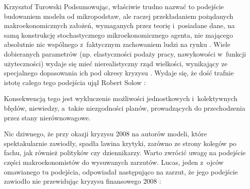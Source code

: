 \begin{artplenv}{Krzysztof Turowski}
Podsumowując, właściwie trudno nazwać to podejście budowaniem modelu od mikropodstaw, ale raczej przekładaniem
pożądanych makroekonomicznych założeń, wymaganych przez teorię i~posiadane dane, na samą konstrukcję stochastycznego
mikroekonomicznego agenta, nie mającego absolutnie nic wspólnego z~faktycznym zachowaniem ludzi na rynku
\parencite{machaj_money_2017}.
Wiele dobieranych parametrów (np. elastyczności podaży pracy,
nawykowości w~funkcji użyteczności) wydaje się mieć nierealistyczny rząd wielkości, wynikający ze specjalnego dopasowania ich pod
okresy kryzysu
\parencite{korinek_thoughts_2017}.
Wydaje się, że dość trafnie istotę całego tego podejścia ujął
Robert Solow
\parencite[s.~241]{solow_state_2008}:


Konsekwencją tego jest wykluczenie możliwości jednostkowych i~kolektywnych błędów, niewiedzy, a~także niezgodności
planów, prowadzących do przechodzenia przez stany nierównowagowe.

Nic dziwnego, że przy okazji kryzysu 2008 na autorów modeli, które spektakularnie zawiodły, spadła lawina krytyki,
zarówno ze strony kolegów po fachu, jak również polityków czy dziennikarzy. Warto zwrócić uwagę na podejście części
makroekonomistów do wysuwanych zarzutów. Lucas, jeden z~ojców omawianego tu podejścia, odpowiadał następująco na
zarzut, że jego podejście zawiodło nie przewidując kryzysu finansowego 2008
\parencite{lucas_defence_2009}:


\end{artplenv}
